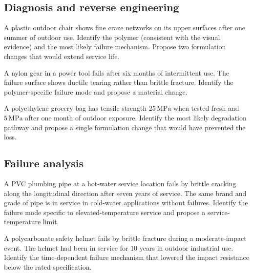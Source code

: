 \subsection*{Diagnosis and reverse engineering}

\begin{exercise}
A plastic outdoor chair shows fine craze networks on its upper
surfaces after one summer of outdoor use. Identify the polymer
(consistent with the visual evidence) and the most likely failure
mechanism. Propose two formulation changes that would extend service
life.
\end{exercise}

\begin{exercise}
A nylon gear in a power tool fails after six months of intermittent
use. The failure surface shows ductile tearing rather than brittle
fracture. Identify the polymer-specific failure mode and propose a
material change.
\end{exercise}

\begin{exercise}
A polyethylene grocery bag has tensile strength $25\,\text{MPa}$ when
tested fresh and $5\,\text{MPa}$ after one month of outdoor exposure.
Identify the most likely degradation pathway and propose a single
formulation change that would have prevented the loss.
\end{exercise}

\subsection*{Failure analysis}

\begin{exercise}
A PVC plumbing pipe at a hot-water service location fails by brittle
cracking along the longitudinal direction after seven years of
service. The same brand and grade of pipe is in service in
cold-water applications without failures. Identify the failure mode
specific to elevated-temperature service and propose a service-
temperature limit.
\end{exercise}

\begin{exercise}
A polycarbonate safety helmet fails by brittle fracture during a
moderate-impact event. The helmet had been in service for $10$ years
in outdoor industrial use. Identify the time-dependent failure
mechanism that lowered the impact resistance below the rated
specification.
\end{exercise}

